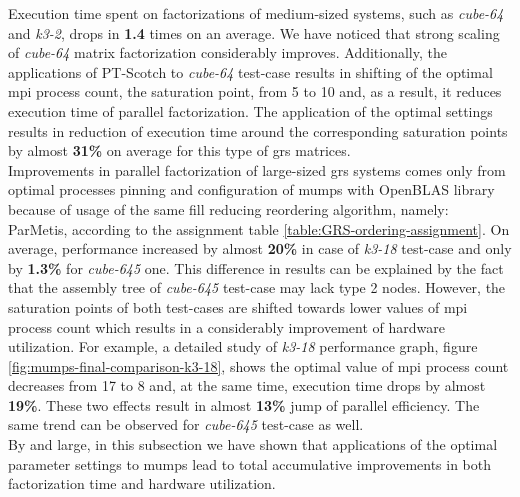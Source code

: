 Execution time spent on factorizations of medium-sized systems, such as \textit{cube-64} and \textit{k3-2}, drops in \textbf{1.4} times on an average. We have noticed that strong scaling of \textit{cube-64} matrix factorization considerably improves. Additionally, the applications of PT-Scotch to \textit{cube-64} test-case results in shifting of the optimal \acrshort{mpi} process count, the saturation point, from 5 to 10 and, as a result, it reduces execution time of parallel factorization. The application of the optimal settings results in reduction of execution time around the corresponding saturation points by almost \textbf{31\%} on average for this type of \acrshort{grs} matrices.\\



Improvements in parallel factorization of large-sized \acrshort{grs} systems comes only from optimal processes pinning and configuration of \acrshort{mumps} with OpenBLAS library because of usage of the same fill reducing reordering algorithm, namely: ParMetis, according to the assignment table \ref{table:GRS-ordering-assignment}. On average, performance increased by almost \textbf{20\%} in case of \textit{k3-18} test-case and only by \textbf{1.3\%} for \textit{cube-645} one. This difference in results can be explained by the fact that the assembly tree of \textit{cube-645} test-case may lack type 2 nodes. However, the saturation points of both test-cases are shifted towards lower values of  \acrshort{mpi} process count which results in a considerably improvement of hardware utilization. For example, a detailed study of \textit{k3-18} performance graph, figure \ref{fig:mumps-final-comparison-k3-18}, shows the optimal value of \acrshort{mpi} process count  decreases from 17 to 8 and, at the same time, execution time drops by almost \textbf{19\%}. These two effects result in almost \textbf{13\%} jump of parallel efficiency. The same trend can be observed for \textit{cube-645} test-case as well.\\


By and large, in this subsection we have shown that applications of the optimal parameter settings to \acrshort{mumps} lead to total accumulative improvements in both factorization time and hardware utilization.\\




